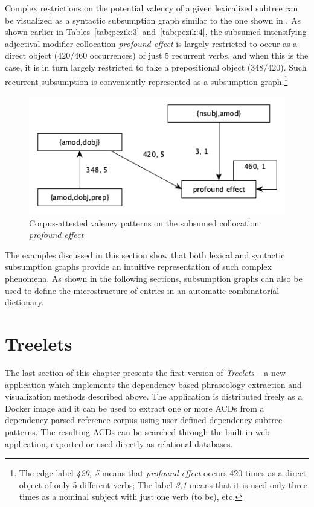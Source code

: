 \documentclass[output=paper]{langscibook}
\begin{document}
Complex restrictions on the potential valency of a given lexicalized subtree can be visualized as a syntactic subsumption graph similar to the one shown in . As shown earlier in Tables~\ref{tab:pezik:3} and~\ref{tab:pezik:4}, the subsumed intensifying adjectival modifier collocation \textit{profound effect} is largely restricted to occur as a direct object (420/460 occurrences) of just 5 recurrent verbs, and when this is the case, it is in turn largely restricted to take a prepositional object (348/420). Such recurrent subsumption is conveniently represented as a subsumption graph.\footnote{The edge label \textit{420, 5} means that \textit{profound effect} occurs 420 times as a direct object of only 5 different verbs; The label \textit{3,1} means that it is used only three times as a nominal subject with just one verb (to be), etc.}

  
\begin{figure}
\includegraphics[width=\textwidth]{figures/pezik-img002.png}
\caption{Corpus-attested valency patterns on the subsumed collocation \textit{profound effect}\label{fig:pezik:2}}
\end{figure}

The examples discussed in this section show that both lexical and syntactic subsumption graphs provide an intuitive representation of such complex phenomena. As shown in the following sections, subsumption graphs can also be used to define the microstructure of entries in an automatic combinatorial dictionary.  

\section{Treelets}

The last section of this chapter presents the first version of \textit{Treelets} -- a new application which implements the dependency-based phraseology extraction and visualization methods described above. The application is distributed freely as a Docker image and it can be used to extract one or more ACDs from a dependency-parsed reference corpus using user-defined dependency subtree patterns. The resulting ACDs can be searched through the built-in web application, exported or used directly as relational databases.
\end{document}
